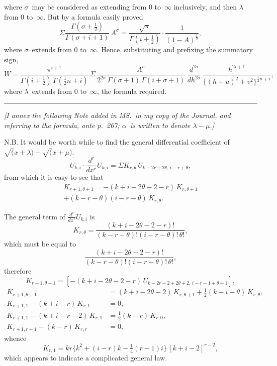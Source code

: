 \documentclass[11pt,a4paper]{article}
\begin{document}
where $\sigma$~may be considered as extending from $0$ to~$\infty$ inclusively, and then $\lambda$ from $0$ to~$\infty$. But by a formula easily proved
\[
\Sigma \frac{\Gamma(\sigma+\frac{1}{2})}{\Gamma(\sigma+i+1)} \, A^\sigma = \frac{\sqrt{\pi}}{\Gamma(i+\frac{1}{2})} \cdot \frac{1}{(1-A)^{\frac{1}{2}}},
\]
where $\sigma$~extends from $0$ to~$\infty$. Hence, substituting and prefixing the summatory sign,
\[
W = \frac{\pi^{i+1}}{\Gamma(i+\frac{1}{2})\,\Gamma(\frac{1}{2}n+i)} \, \Sigma \, \frac{A^\sigma}{2^{2\sigma}\,\Gamma(\sigma+1)\,\Gamma(i+\sigma+1)} \, \frac{d^{2\sigma}}{dh^{2\sigma}} \, \frac{h^{2i+1}}{\{(h+u)^2 + v^2\}^{\frac{1}{2}n+i}},
\]
where $\lambda$~extends from $0$ to~$\infty$, the formula required.

\vspace{10pt}
\noindent\rule{\textwidth}{0.4pt}
\vspace{4pt}
\footnotesize
\textit{[I annex the following Note added in MS.\ in my copy of the Journal, and referring to the formula, ante p.~267; $\alpha$~is written to denote $\lambda - \mu$.]}

N.B. It would be worth while to find the general differential coefficient of $\surd(x+\lambda) - \surd(x+\mu)$.
\[
U_{k,i} \cdot \frac{d^r}{dx^r} U_{k,i} = \Sigma K_{r,\theta} \, U_{k-2r+2\theta,\, i-r+\theta},
\]
from which it is easy to see that
\begin{multline*}
K_{r+1,\theta+1} = -(k+i-2\theta-2-r) \, K_{r,\theta+1} \\
+ (k-r-\theta)(i-r-\theta) \, K_{r,\theta}.
\end{multline*}

The general term of $\frac{d^r}{dx^r} U_{k,i}$ is
\[
K_{r,\theta} = \frac{(k+i-2\theta-2-r)!}{(k-r-\theta)!(i-r-\theta)!\,\theta!},
\]
which must be equal to
\[
\frac{(k+i-2\theta-2-r)!}{(k-r-\theta)!(i-r-\theta)!\,\theta!},
\]
therefore
\[
K_{r+1,\theta+1} = [-(k+i-2\theta-2-r)\,U_{k-2r-2+2\theta+2,\,i-r-1+\theta+1}],
\]
\begin{align*}
K_{r+1,\theta+1} &= (k+i-2\theta-2)\,K_{r,\theta+1} + \tfrac{1}{2}(k-i-\theta)\,K_{r,\theta},\\
K_{r+1,1} - (k+i-r)\,K_{r,1} &= 0,\\
K_{r+1,1} - (k+i-r-2)\,K_{r,1} &= \tfrac{1}{2}(k-r)\,K_{r,0},\\
K_{r+1,r+1} - (k-r)\,K_{r,r} &= 0,
\end{align*}
whence
\[
K_{r,1} = kr \{k^2 + (i-r)k - \tfrac{1}{4}(r-1)i\} \, [k+i-2]^{r-2},
\]
which appears to indicate a complicated general law.
\end{document}
